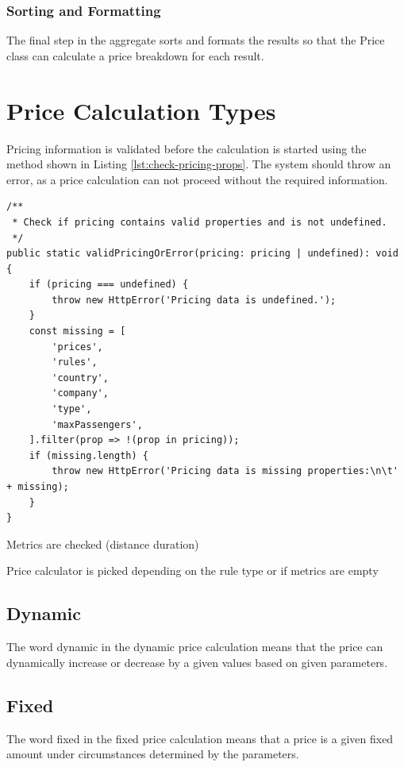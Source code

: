 \subsubsection{Sorting and Formatting}
The final step in the aggregate sorts and formats the results so that the Price class can calculate a price breakdown for each result.


\section{Price Calculation Types}
Pricing information is validated before the calculation is started using the method shown in Listing \ref{lst:check-pricing-props}. The system should throw an error, as a price calculation can not proceed without the required information.

\begin{lstlisting}[caption={Find missing properties.}, label={lst:check-pricing-props}]
/**
 * Check if pricing contains valid properties and is not undefined.
 */
public static validPricingOrError(pricing: pricing | undefined): void {
	if (pricing === undefined) {
		throw new HttpError('Pricing data is undefined.');
	}
	const missing = [
		'prices',
		'rules',
		'country',
		'company',
		'type',
		'maxPassengers',
	].filter(prop => !(prop in pricing));
	if (missing.length) {
		throw new HttpError('Pricing data is missing properties:\n\t' + missing);
	}
}
\end{lstlisting}


Metrics are checked (distance duration)

Price calculator is picked depending on the rule type or if metrics are empty

\subsection{Dynamic}
The word dynamic in the dynamic price calculation means that the price can dynamically increase or decrease by a given values based on given parameters.
\subsection{Fixed}
The word fixed in the fixed price calculation means that a price is a given fixed amount under circumstances determined by the parameters.
